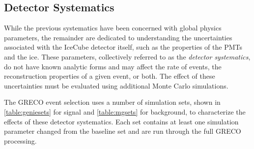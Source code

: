 \label{subsec:detector_systematics}
\subsection{Detector Systematics}
While the previous systematics have been concerned with global physics parameters, the remainder are dedicated to understanding the uncertainties associated with the IceCube detector itself, such as the properties of the PMTs and the ice.
These parameters, collectively referred to as the \emph{detector systematics}, do not have known analytic forms and may affect the rate of events, the reconstruction properties of a given event, or both.
The effect of these uncertainties must be evaluated using additional Monte Carlo simulations.

The GRECO event selection uses a number of simulation sets, shown in \ref{table:geniesets} for signal and \ref{table:mgsets} for background, to characterize the effects of these detector systematics.
Each set contains at least one simulation parameter changed from the baseline set and are run through the full GRECO processing.

